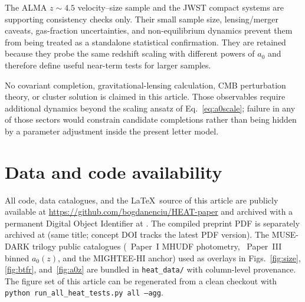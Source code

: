 \documentclass[twocolumn,letterpaper]{aastex631}
\newcommand{\azero}{a_0}
\begin{document}
The ALMA $z\!\sim\!4.5$ velocity--size sample and the JWST compact
systems are supporting consistency checks only.  Their small sample
size, lensing/merger caveats, gas-fraction uncertainties, and
non-equilibrium dynamics prevent them from being treated as a
standalone statistical confirmation.  They are retained because they
probe the same redshift scaling with different powers of $\azero$ and
therefore define useful near-term tests for larger samples.

No covariant completion, gravitational-lensing calculation, CMB
perturbation theory, or cluster solution is claimed in this article.
Those observables require additional dynamics beyond the scaling ansatz
of Eq.~\ref{eq:a0scale}; failure in any of those sectors would constrain
candidate completions rather than being hidden by a parameter adjustment
inside the present letter model.

\section*{Data and code availability}

All code, data catalogues, and the \LaTeX\ source of this article
are publicly available at
\url{https://github.com/bogdanenciu/HEAT-paper} and archived with
a permanent Digital Object Identifier at
.
The compiled preprint PDF is separately archived at
(same title; concept DOI tracks the latest PDF version).
The MUSE-DARK trilogy public catalogues
(\citealt{Ciocan2026Halo}~Paper~I MHUDF photometry,
\citealt{Ciocan2026RAR}~Paper~III binned $\azero(z)$, and the
\citealt{Varasteanu2025} MIGHTEE-HI anchor) used as overlays in
Figs.~\ref{fig:size}, \ref{fig:btfr}, and~\ref{fig:a0z} are
bundled in \texttt{heat\_data/} with column-level provenance.  The
figure set of this article can be regenerated from a clean
checkout with
\texttt{python run\_all\_heat\_tests.py all --agg}.



\end{document}
